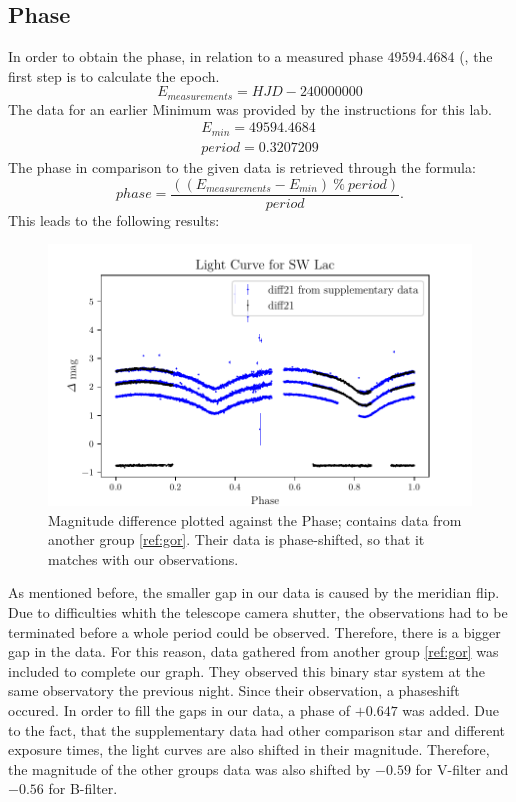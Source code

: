 \subsection{Phase}
  \label{sec:again}
  In order to obtain the phase, in relation to a measured phase $49594.4684$ (, the first step is to calculate the epoch.
  \begin{equation*}
    E_{measurements} = HJD - 240000000
  \end{equation*}
 The data for an earlier Minimum was provided by the 
  instructions for this lab. 
  \begin{align*}
    E_{min} = 49594.4684\\
    period = 0.3207209
  \end{align*}
  The phase in comparison to the given data is retrieved through the formula:
  \begin{equation}
    phase = \dfrac{((E_{measurements}-E_{min})\ \% \ period)}{period}.
  \end{equation}
  This leads to the following results:
  \begin{figure}[H]
    \centering
    \includegraphics{gdPhase.pdf}
    \caption{Magnitude difference plotted against the Phase; contains data from another group
    \ref{ref:gor}. Their data is phase-shifted, so that it matches with our observations.}
    \label{fig:phase}
  \end{figure}
  \noindent As mentioned before, the smaller gap in our data is caused by the meridian flip. 
  Due to difficulties whith the telescope camera shutter, the observations had to be terminated
  before a whole period could be observed. Therefore, there is a bigger gap in the 
  data. For this reason, data gathered from another group \ref{ref:gor} was included to complete our graph. 
  They observed this binary star system at the same observatory the previous night. Since their
  observation, a phaseshift occured. In order to fill the gaps in our data,
  a phase of $+0.647$ was added. Due to the fact, that the supplementary data had other 
  comparison star and different exposure times, the light curves are also shifted in their
  magnitude. Therefore, the magnitude of the other groups data was also shifted
  by $-0.59$ for V-filter and $-0.56$ for B-filter.\\
 
